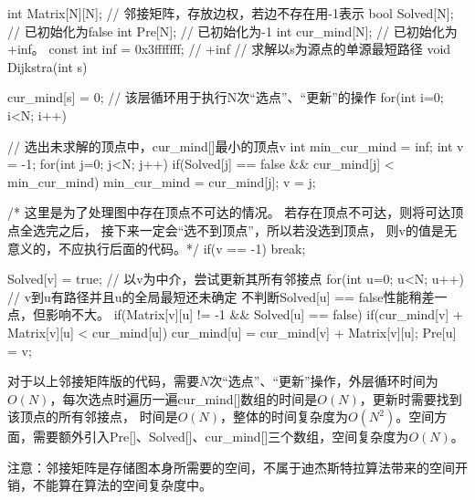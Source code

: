 \begin{cppcode}
    int Matrix[N][N];   // 邻接矩阵，存放边权，若边不存在用-1表示
    bool Solved[N];     // 已初始化为false
    int Pre[N];         // 已初始化为-1
    int cur_mind[N];    // 已初始化为 +inf。
    const int inf = 0x3fffffff; // +inf
    // 求解以s为源点的单源最短路径
    void Dijkstra(int s) {
        cur_mind[s] = 0;
        // 该层循环用于执行N次“选点”、“更新”的操作
        for(int i=0; i<N; i++) {
            // 选出未求解的顶点中，cur_mind[]最小的顶点v
            int min_cur_mind = inf;
            int v = -1;
            for(int j=0; j<N; j++) {
                if(Solved[j] == false && cur_mind[j] < min_cur_mind) {
                    min_cur_mind = cur_mind[j];
                    v = j;
                }
            }

            /* 这里是为了处理图中存在顶点不可达的情况。
             若存在顶点不可达，则将可达顶点全选完之后，
             接下来一定会“选不到顶点”，所以若没选到顶点，
             则v的值是无意义的，不应执行后面的代码。*/
            if(v == -1) {
                break;
            }
            
            Solved[v] = true;
            // 以v为中介，尝试更新其所有邻接点
            for(int u=0; u<N; u++) {
                // v到u有路径并且u的全局最短还未确定 不判断Solved[u] == false性能稍差一点，但影响不大。
                if(Matrix[v][u] != -1 && Solved[u] == false) {    
                    if(cur_mind[v] + Matrix[v][u] < cur_mind[u]) {
                        cur_mind[u] = cur_mind[v] + Matrix[v][u];
                        Pre[u] = v;
                    }
                }
            } 
        } 
    }
    
\end{cppcode}
对于以上邻接矩阵版的代码，需要$N$次“选点”、“更新”操作，外层循环时间为$O(N)$，每次选点时遍历一遍cur\_mind[]数组的时间是$O(N)$，更新时需要找到该顶点的所有邻接点，
时间是$O(N)$，整体的时间复杂度为$O(N^2)$。空间方面，需要额外引入Pre[]、Solved[]、cur\_mind[]三个数组，空间复杂度为$O(N)$。

注意：邻接矩阵是存储图本身所需要的空间，不属于迪杰斯特拉算法带来的空间开销，不能算在算法的空间复杂度中。

